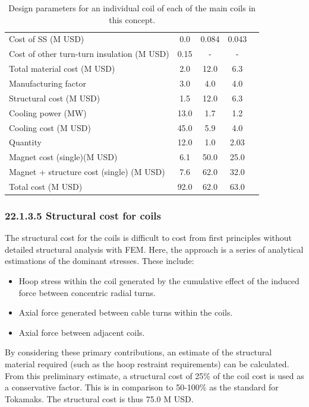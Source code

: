 \begin{table}[h!]
{\begin{tabular}{lcccc}
Cost of SS (M USD) & 0.0 & 0.084 & 0.043 \\
Cost of other turn-turn insulation (M USD) & 0.15 & - & - \\
Total material cost (M USD) & 2.0 & 12.0 & 6.3 \\
Manufacturing factor & 3.0 & 4.0 & 4.0 \\
Structural cost (M USD) & 1.5 & 12.0 & 6.3 \\
Cooling power (MW) & 13.0 & 1.7 & 1.2 \\
Cooling cost (M USD) & 45.0 & 5.9 & 4.0 \\
Quantity & 12.0 & 1.0 & 2.03 \\
Magnet cost (single)(M USD) & 6.1 & 50.0 & 25.0 \\
Magnet + structure cost (single) (M USD) & 7.6 & 62.0 & 32.0 \\
\hline
Total cost (M USD) & 92.0 & 62.0 & 63.0 \\
\hline
\end{tabular}}
\caption{Design parameters for an individual coil of each of the main coils in this concept.}
\label{your-table-label}
\end{table}



\subsubsection*{22.1.3.5 Structural cost for coils}

The structural cost for the coils is difficult to cost from first principles without detailed structural analysis with FEM. Here, the approach is a series of analytical estimations of the dominant stresses. These include:

\begin{itemize}
    \item Hoop stress within the coil generated by the cumulative effect of the induced force between concentric radial turns.
    \item Axial force generated between cable turns within the coils. 
    \item Axial force between adjacent coils.
\end{itemize}


By considering these primary contributions, an estimate of the structural material required (such as the hoop restraint requirements) can be calculated. From this preliminary estimate, a structural cost of 25\% of the coil cost is used as a conservative factor. This is in comparison to 50-100\% as the standard for Tokamaks. The structural cost is thus 75.0 M USD.


